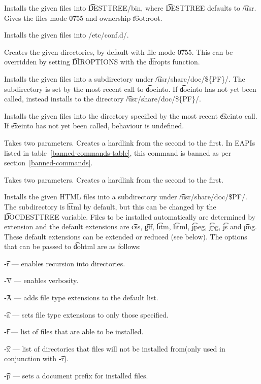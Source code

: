 \begin{description}
\item[dobin] Installs the given files into \t{DESTTREE/bin}, where \t{DESTTREE} defaults to
    \t{/usr}. Gives the files mode \t{0755} and ownership \t{root:root}.

\item[doconfd] Installs the given files into /etc/conf.d/.

\item[dodir] Creates the given directories, by default with file mode \t{0755}. This can be overridden
    by setting \t{DIROPTIONS} with the \t{diropts} function.

\item[dodoc] Installs the given files into a subdirectory under \t{/usr/share/doc/\$\{PF\}/}. The
    subdirectory is set by the most recent call to \t{docinto}. If \t{docinto} has not
    yet been called, instead installs to the directory \t{/usr/share/doc/\$\{PF\}/}.

\item[doexe] Installs the given files into the directory specified by the most recent
    \t{exeinto} call. If \t{exeinto} has not yet been called, behaviour is undefined.

\IFKDEBUILDELSE
{
    \item[dohard] Takes two parameters. Creates a hardlink from the second to the first. In EAPIs
    listed in table~\ref{banned-commands-table}, this command is banned as per
    section~\ref{banned-commands}.
}{
    \item[dohard] Takes two parameters. Creates a hardlink from the second to the first.
}

\item[dohtml] Installs the given HTML files into a subdirectory under \t{/usr/share/doc/\$PF/}.
The subdirectory is \t{html} by default, but this can be changed by the \t{DOCDESTTREE}
variable. Files to be installed automatically are determined by extension and the default
extensions are \t{css}, \t{gif}, \t{htm}, \t{html}, \t{jpeg}, \t{jpg}, \t{js} and \t{png}. These default
extensions can be extended or reduced (see below). The options that can be passed to \t{dohtml}
are as follows:
    \begin{description}
    \item{\t{-r}} --- enables recursion into directories.
    \item{\t{-V}} --- enables verbosity.
    \item{\t{-A}} --- adds file type extensions to the default list.
    \item{\t{-a}} --- sets file type extensions to only those specified.
    \item{\t{-f}} --- list of files that are able to be installed.
    \item{\t{-x}} --- list of directories that files will not be installed from(only used in
    conjunction with \t{-r}).
    \item{\t{-p}} --- sets a document prefix for installed files.
    \end{description}


\end{description}
